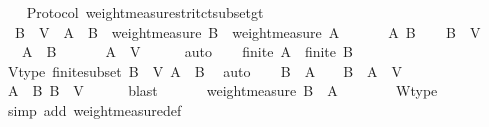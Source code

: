 \begin{isabellebody}
%
\isadelimproof
\isanewline
%
\endisadelimproof
\ \isanewline
{}\isamarkupfalse%
\ {\isacharparenleft}\ Protocol{\isacharparenright}\ weight{\isacharunderscore}measure{\isacharunderscore}stritct{\isacharunderscore}subset{\isacharunderscore}gt\ {\isacharcolon}\isanewline
\ \ {\isachardoublequoteopen}B\ {\isasymsubseteq}\ V\ {\isasymLongrightarrow}\ A\ {\isasymsubset}\ B\ {\isasymLongrightarrow}\ weight{\isacharunderscore}measure\ B\ {\isachargreater}\ weight{\isacharunderscore}measure\ A{\isachardoublequoteclose}\ \isanewline
%
\isadelimproof
%
\endisadelimproof
%
\isatagproof
{}\isamarkupfalse%
\ {\isacharminus}\isanewline
\ \ \isamarkupfalse%
\ A\ B\isanewline
\ \ \isamarkupfalse%
\ {\isachardoublequoteopen}B\ {\isasymsubseteq}\ V{\isachardoublequoteclose}\ \isanewline
\ \ \ {\isachardoublequoteopen}A\ {\isasymsubset}\ B{\isachardoublequoteclose}\ \isanewline
\ \ \isamarkupfalse%
\ \isamarkupfalse%
\ {\isachardoublequoteopen}A\ {\isasymsubset}\ V{\isachardoublequoteclose}\isanewline
\ \ \ \ \isamarkupfalse%
\ auto\isanewline
\ \ \isamarkupfalse%
\ {\isachardoublequoteopen}finite\ A\ {\isasymand}\ finite\ B{\isachardoublequoteclose}\isanewline
\ \ \ \ \isamarkupfalse%
\ V{\isacharunderscore}type\ finite{\isacharunderscore}subset\ {\isacartoucheopen}B\ {\isasymsubseteq}\ V{\isacartoucheclose}\ {\isacartoucheopen}A\ {\isasymsubset}\ B{\isacartoucheclose}\ \isamarkupfalse%
\ auto\isanewline
\ \ \isamarkupfalse%
\ {\isachardoublequoteopen}B\ {\isacharminus}\ A\ {\isasymnoteq}\ {\isasymemptyset}\ {\isasymand}\ B\ {\isacharminus}\ A\ {\isasymsubseteq}\ V{\isachardoublequoteclose}\isanewline
\ \ \ \ \isamarkupfalse%
\ {\isacartoucheopen}A\ {\isasymsubset}\ B{\isacartoucheclose}\ {\isacartoucheopen}B\ {\isasymsubseteq}\ V{\isacartoucheclose}\isanewline
\ \ \ \ \isamarkupfalse%
\ blast\ \isanewline
\ \ \isamarkupfalse%
\ \isamarkupfalse%
\ {\isachardoublequoteopen}weight{\isacharunderscore}measure\ {\isacharparenleft}B\ {\isacharminus}\ A{\isacharparenright}\ {\isachargreater}\ {}{\isachardoublequoteclose}\isanewline
\ \ \ \ \isamarkupfalse%
\ W{\isacharunderscore}type\isanewline
\ \ \ \ \isamarkupfalse%
\ {\isacharparenleft}simp\ add{\isacharcolon}\ weight{\isacharunderscore}measure{\isacharunderscore}def{\isacharparenright}\isanewline
\ \ \ \ \isamarkupfalse%

\end{isabellebody}
